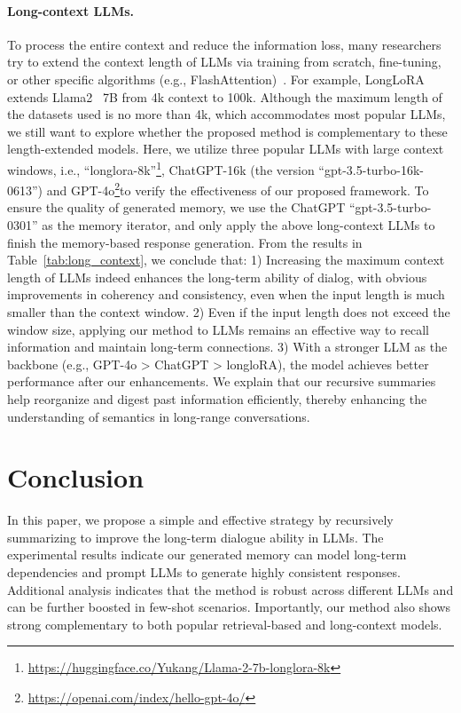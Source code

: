 \documentclass[authoryear,preprint,review,12pt]{elsarticle}
\begin{document}
 \paragraph{Long-context LLMs.}  To process the entire context and reduce the information loss, many researchers try to extend the context length of LLMs via training from scratch, fine-tuning, or other specific algorithms (e.g., FlashAttention)~\citep{Dao2022FlashAttentionFA}. For example, LongLoRA~\citep{Chen2023LongLoRAEF} extends Llama2~\citep{llama2} 7B from 4k context to 100k. Although the maximum length of the datasets used is no more than 4k, which accommodates most popular LLMs, we still want to explore whether the proposed method is complementary to these length-extended models. Here, we utilize three popular LLMs with large context windows, i.e., ``longlora-8k''\footnote{\url{https://huggingface.co/Yukang/Llama-2-7b-longlora-8k}},  ChatGPT-16k (the version ``gpt-3.5-turbo-16k-0613'') and GPT-4o\footnote{\url{https://openai.com/index/hello-gpt-4o/}}to verify the effectiveness of our proposed framework. To ensure the quality of generated memory, we use the ChatGPT ``gpt-3.5-turbo-0301'' as the memory iterator, and only apply the above long-context LLMs to finish the memory-based response generation. From the results in Table~\ref{tab:long_context}, we conclude that: 1) Increasing the maximum context length of LLMs indeed enhances the long-term ability of dialog, with obvious improvements in coherency and consistency, even when the input length is much smaller than the context window. 2) Even if the input length does not exceed the window size, applying our method to LLMs remains an effective way to recall information and maintain long-term connections. 3) With a stronger LLM as the backbone (e.g., GPT-4o > ChatGPT > longloRA), the model achieves better performance after our enhancements. We explain that our recursive summaries help reorganize and digest past information efficiently, thereby enhancing the understanding of semantics in long-range conversations.


\section{Conclusion}
In this paper, we propose a simple and effective strategy by recursively summarizing to improve the long-term dialogue ability in LLMs. The experimental results indicate our generated memory can model long-term dependencies and prompt LLMs to generate highly consistent responses. 
Additional analysis indicates that the method is robust across different LLMs and can be further boosted in few-shot scenarios. Importantly, our method also shows strong complementary to both popular retrieval-based and long-context models.
\end{document}
